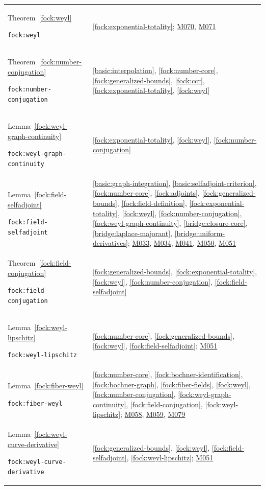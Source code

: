 \documentclass[11pt,a4paper]{article}
\theoremstyle{definition}
\theoremstyle{remark}
\begin{document}
\begin{longtable}{@{}p{}p{}@{}}
Theorem~\ref{fock:weyl}\par\nolinkurl{fock:weyl} & \ref{fock:exponential-totality}; \hyperref[base:M070]{M070}, \hyperref[base:M071]{M071} \\[4pt]
Theorem~\ref{fock:number-conjugation}\par\nolinkurl{fock:number-conjugation} & \ref{basic:interpolation}, \ref{fock:number-core}, \ref{fock:generalized-bounds}, \ref{fock:ccr}, \ref{fock:exponential-totality}, \ref{fock:weyl} \\[4pt]
Lemma~\ref{fock:weyl-graph-continuity}\par\nolinkurl{fock:weyl-graph-continuity} & \ref{fock:exponential-totality}, \ref{fock:weyl}, \ref{fock:number-conjugation} \\[4pt]
Lemma~\ref{fock:field-selfadjoint}\par\nolinkurl{fock:field-selfadjoint} & \ref{basic:graph-integration}, \ref{basic:selfadjoint-criterion}, \ref{fock:number-core}, \ref{fock:adjoints}, \ref{fock:generalized-bounds}, \ref{fock:field-definition}, \ref{fock:exponential-totality}, \ref{fock:weyl}, \ref{fock:number-conjugation}, \ref{fock:weyl-graph-continuity}, \ref{bridge:closure-core}, \ref{bridge:laplace-majorant}, \ref{bridge:uniform-derivatives}; \hyperref[base:M033]{M033}, \hyperref[base:M034]{M034}, \hyperref[base:M041]{M041}, \hyperref[base:M050]{M050}, \hyperref[base:M051]{M051} \\[4pt]
Theorem~\ref{fock:field-conjugation}\par\nolinkurl{fock:field-conjugation} & \ref{fock:generalized-bounds}, \ref{fock:exponential-totality}, \ref{fock:weyl}, \ref{fock:number-conjugation}, \ref{fock:field-selfadjoint} \\[4pt]
Lemma~\ref{fock:weyl-lipschitz}\par\nolinkurl{fock:weyl-lipschitz} & \ref{fock:number-core}, \ref{fock:generalized-bounds}, \ref{fock:weyl}, \ref{fock:field-selfadjoint}; \hyperref[base:M051]{M051} \\[4pt]
Lemma~\ref{fock:fiber-weyl}\par\nolinkurl{fock:fiber-weyl} & \ref{fock:number-core}, \ref{fock:bochner-identification}, \ref{fock:bochner-graph}, \ref{fock:fiber-fields}, \ref{fock:weyl}, \ref{fock:number-conjugation}, \ref{fock:weyl-graph-continuity}, \ref{fock:field-conjugation}, \ref{fock:weyl-lipschitz}; \hyperref[base:M058]{M058}, \hyperref[base:M059]{M059}, \hyperref[base:M079]{M079} \\[4pt]
Lemma~\ref{fock:weyl-curve-derivative}\par\nolinkurl{fock:weyl-curve-derivative} & \ref{fock:generalized-bounds}, \ref{fock:weyl}, \ref{fock:field-selfadjoint}, \ref{fock:weyl-lipschitz}; \hyperref[base:M051]{M051} \\[4pt]

\end{longtable}
\end{document}
